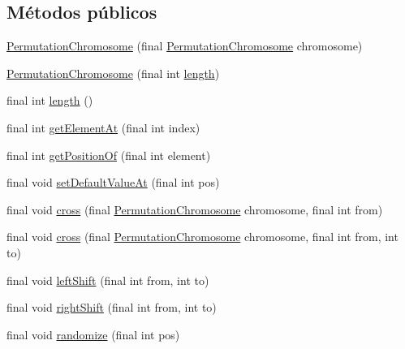 \subsection*{Métodos públicos}
\begin{DoxyCompactItemize}
\item 
\hyperlink{classjenes_1_1chromosome_1_1_permutation_chromosome_a10cdd7769af8702d9b367b1a7a17214d}{Permutation\-Chromosome} (final \hyperlink{classjenes_1_1chromosome_1_1_permutation_chromosome}{Permutation\-Chromosome} chromosome)
\item 
\hyperlink{classjenes_1_1chromosome_1_1_permutation_chromosome_a7c3b4e904d419c51af512f1f82faa109}{Permutation\-Chromosome} (final int \hyperlink{classjenes_1_1chromosome_1_1_permutation_chromosome_abbdf232b2c833492472f1c487c23fadd}{length})
\item 
final int \hyperlink{classjenes_1_1chromosome_1_1_permutation_chromosome_abbdf232b2c833492472f1c487c23fadd}{length} ()
\item 
final int \hyperlink{classjenes_1_1chromosome_1_1_permutation_chromosome_a8c2aee80f46c4634d6797a346a6560cc}{get\-Element\-At} (final int index)
\item 
final int \hyperlink{classjenes_1_1chromosome_1_1_permutation_chromosome_a0c8a75c9417def5db8724d22aadf0303}{get\-Position\-Of} (final int element)
\item 
final void \hyperlink{classjenes_1_1chromosome_1_1_permutation_chromosome_a10210f11733f4d94e2743112179a2bf6}{set\-Default\-Value\-At} (final int pos)
\item 
final void \hyperlink{classjenes_1_1chromosome_1_1_permutation_chromosome_a3fda59734f77c447518e49086f7be0c2}{cross} (final \hyperlink{classjenes_1_1chromosome_1_1_permutation_chromosome}{Permutation\-Chromosome} chromosome, final int from)
\item 
final void \hyperlink{classjenes_1_1chromosome_1_1_permutation_chromosome_a19caa5ba36809bcbca85c990741731cb}{cross} (final \hyperlink{classjenes_1_1chromosome_1_1_permutation_chromosome}{Permutation\-Chromosome} chromosome, final int from, int to)
\item 
final void \hyperlink{classjenes_1_1chromosome_1_1_permutation_chromosome_a722e6ef2208337802c0a229b77a56629}{left\-Shift} (final int from, int to)
\item 
final void \hyperlink{classjenes_1_1chromosome_1_1_permutation_chromosome_afc488bdb0b77b15da659cde89a4e08b7}{right\-Shift} (final int from, int to)
\item 
final void \hyperlink{classjenes_1_1chromosome_1_1_permutation_chromosome_aea4acb031fb2b00f579be5c448825c47}{randomize} (final int pos)

\end{DoxyCompactItemize}
